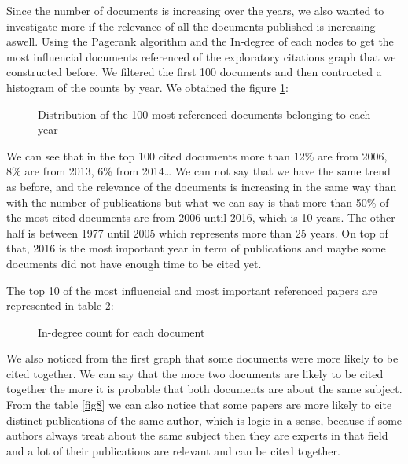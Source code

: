 \documentclass[article,twocolumn]{IEEEtran}
\begin{document}
    Since the number of documents is increasing over the years, we also
wanted to investigate more if the relevance of all the documents
published is increasing aswell. Using the Pagerank algorithm and the
In-degree of each nodes to get the most influencial documents referenced
of the exploratory citations graph that we constructed before. We
filtered the first 100 documents and then contructed a histogram of the
counts by year. We obtained the figure \ref{fig7}:


    \begin{figure}
        \begin{center}\end{center}
        \caption{Distribution of the 100 most referenced documents belonging to each year}
        \label{fig7}
    \end{figure}
    
    We can see that in the top 100 cited documents more than 12\% are from
2006, 8\% are from 2013, 6\% from 2014\ldots{} We can not say that we
have the same trend as before, and the relevance of the documents is
increasing in the same way than with the number of publications but what
we can say is that more than 50\% of the most cited documents are from
2006 until 2016, which is 10 years. The other half is between 1977 until
2005 which represents more than 25 years. On top of that, 2016 is the
most important year in term of publications and maybe some documents did
not have enough time to be cited yet.

    The top 10 of the most influencial and most important referenced papers
are represented in table \ref{indegree}:


    \begin{figure}
        \begin{center}\end{center}
        \caption{In-degree count for each document}
        \label{indegree}
    \end{figure}
    
    We also noticed from the first graph that some documents were more
likely to be cited together. We can say that the more two documents are
likely to be cited together the more it is probable that both documents
are about the same subject. From the table \ref{fig8} we can also notice
that some papers are more likely to cite distinct publications of the
same author, which is logic in a sense, because if some authors always
treat about the same subject then they are experts in that field and a
lot of their publications are relevant and can be cited together.
\end{document}
